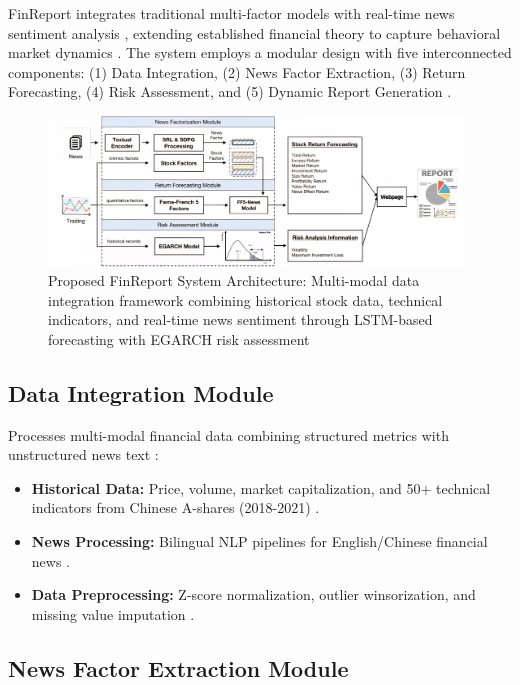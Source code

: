\documentclass[3p,times,procedia]{elsarticle}
\begin{document}
FinReport integrates traditional multi-factor models \cite{FAMA1993,Carhart1997} with real-time news sentiment analysis \cite{TETLOCK2007}, extending established financial theory to capture behavioral market dynamics \cite{Daniel1998}. The system employs a modular design with five interconnected components: (1) Data Integration, (2) News Factor Extraction, (3) Return Forecasting, (4) Risk Assessment, and (5) Dynamic Report Generation \cite{Fischer2018}.

\begin{figure}[!ht]
    \centering
    \includegraphics[width=0.98\textwidth]{flowchart.jpg}
    \caption{Proposed FinReport System Architecture: Multi-modal data integration framework combining historical stock data, technical indicators, and real-time news sentiment through LSTM-based forecasting with EGARCH risk assessment}
    \label{fig:workflow_diagram}
\end{figure}

\subsection{{Data Integration Module}}

Processes multi-modal financial data combining structured metrics with unstructured news text \cite{Harvey2016}:
\begin{itemize}
\item \textbf{Historical Data:} Price, volume, market capitalization, and 50+ technical indicators from Chinese A-shares (2018-2021) \cite{FinReportDataset2025}.
\item \textbf{News Processing:} Bilingual NLP pipelines for English/Chinese financial news \cite{Loughran2011}.
\item \textbf{Data Preprocessing:} Z-score normalization, outlier winsorization, and missing value imputation \cite{Fischer2018}.
\end{itemize}

\subsection{{News Factor Extraction Module}}
\end{document}
